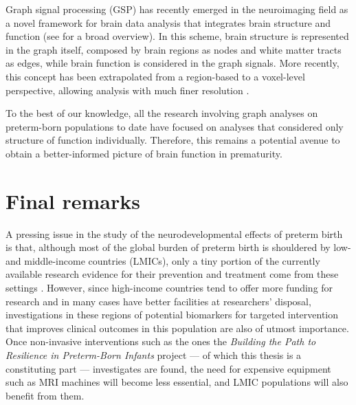 Graph signal processing (GSP) has recently emerged in the neuroimaging field as a novel framework for brain data analysis that integrates brain structure and function (see \citet{Huang2018} for a broad overview). In this scheme, brain structure is represented in the graph itself, composed by brain regions as nodes and white matter tracts as edges, while brain function is considered in the graph signals. More recently, this concept has been extrapolated from a region-based to a voxel-level perspective, allowing analysis with much finer resolution \citep{Tarun2020}.

To the best of our knowledge, all the research involving graph analyses on preterm-born populations to date have focused on analyses that considered only structure of function individually. Therefore, this remains a potential avenue to obtain a better-informed picture of brain function in prematurity.


\section{Final remarks}

A pressing issue in the study of the neurodevelopmental effects of preterm birth is that, although most of the global burden of preterm birth is shouldered by low- and middle-income countries (LMICs), only a tiny portion of the currently available research evidence for their prevention and treatment come from these settings \citep{Smid2016}. However, since high-income countries tend to offer more funding for research and in many cases have better facilities at researchers' disposal, investigations in these regions of potential biomarkers for targeted intervention that improves clinical outcomes in this population are also of utmost importance. Once non-invasive interventions such as the ones the \textit{Building the Path to Resilience in Preterm-Born Infants} project --- of which this thesis is a constituting part --- investigates are found, the need for expensive equipment such as MRI machines will become less essential, and LMIC populations will also benefit from them.  

\clearpage